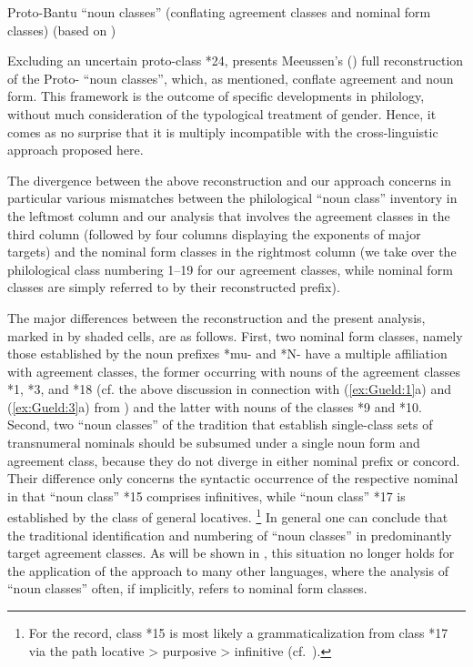 \documentclass[output=collectionpaper]{langsci/langscibook}
\begin{document}
\begin{table}[htb]
\caption{Proto-Bantu ``noun classes'' (conflating agreement classes and nominal form classes) (based on \citealt[96--99]{Meeussen1967})}
\label{tab:Gueld:2}
\end{table}

Excluding an uncertain proto-class *24,  presents Meeussen's (\citeyear[96--99]{Meeussen1967}) full reconstruction of the Proto- ``noun classes'', which, as mentioned, conflate agreement and noun form. This framework is the outcome of specific developments in  philology, without much consideration of the typological treatment of gender. Hence, it comes as no surprise that it is multiply incompatible with the cross-linguistic approach proposed here.

The divergence between the above  reconstruction and our approach concerns in particular various mismatches between the philological ``noun class'' inventory in the leftmost column and our analysis that involves the agreement classes in the third column (followed by four columns displaying the exponents of major targets) and the nominal form classes in the rightmost column (we take over the philological class numbering 1--19 for our agreement classes, while nominal form classes are simply referred to by their reconstructed prefix).

The major differences between the  reconstruction and the present analysis, marked in  by shaded cells, are as follows. First, two nominal form classes, namely those established by the noun prefixes *mu- and *N- have a multiple affiliation with agreement classes, the former occurring with nouns of the agreement classes *1, *3, and *18 (cf. the above discussion in connection with (\ref{ex:Gueld:1}a) and (\ref{ex:Gueld:3}a) from ) and the latter with nouns of the classes *9 and *10. Second, two ``noun classes'' of the  tradition that establish single-class sets of transnumeral nominals should be subsumed under a single noun form and agreement class, because they do not diverge in either nominal prefix or concord. Their difference only concerns the syntactic occurrence of the respective nominal in that ``noun class'' *15 comprises infinitives, while ``noun class'' *17 is established by the class of general locatives.%
\footnote{For the record, class *15 is most likely a grammaticalization from class *17 via the path locative > purposive > infinitive (cf.\ \citealt{Haspelmath1989}).} In general one can conclude that the traditional identification and numbering of ``noun classes'' in  predominantly target agreement classes. As will be shown in , this situation no longer holds for the application of the approach to many other  languages, where the analysis of ``noun classes'' often, if implicitly, refers to nominal form classes.
\end{document}
